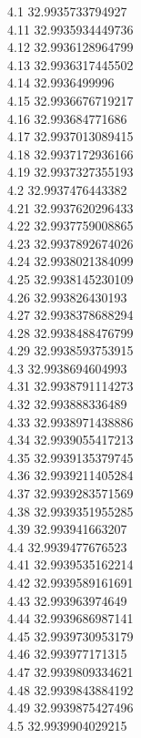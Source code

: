 {4.1	32.9935733794927\\
4.11	32.9935934449736\\
4.12	32.9936128964799\\
4.13	32.9936317445502\\
4.14	32.9936499996\\
4.15	32.9936676719217\\
4.16	32.993684771686\\
4.17	32.9937013089415\\
4.18	32.9937172936166\\
4.19	32.9937327355193\\
4.2	32.9937476443382\\
4.21	32.9937620296433\\
4.22	32.9937759008865\\
4.23	32.9937892674026\\
4.24	32.9938021384099\\
4.25	32.9938145230109\\
4.26	32.993826430193\\
4.27	32.9938378688294\\
4.28	32.9938488476799\\
4.29	32.9938593753915\\
4.3	32.9938694604993\\
4.31	32.9938791114273\\
4.32	32.993888336489\\
4.33	32.9938971438886\\
4.34	32.9939055417213\\
4.35	32.9939135379745\\
4.36	32.9939211405284\\
4.37	32.9939283571569\\
4.38	32.9939351955285\\
4.39	32.993941663207\\
4.4	32.9939477676523\\
4.41	32.9939535162214\\
4.42	32.9939589161691\\
4.43	32.993963974649\\
4.44	32.9939686987141\\
4.45	32.9939730953179\\
4.46	32.993977171315\\
4.47	32.9939809334621\\
4.48	32.9939843884192\\
4.49	32.9939875427496\\
4.5	32.9939904029215\\
}
